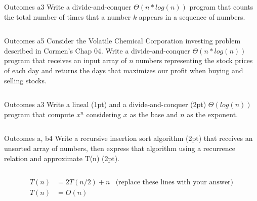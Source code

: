\begin{problem}{Outcomes a}{3}
    Write a divide-and-conquer $\Theta(n*log(n))$ program that counts the total number of times that a number $k$ appears in a sequence of numbers.

    \inputminted[fontsize=\small,breaklines]{cpp}{answers/problem2/problem2.cpp}
\end{problem}

\begin{problem}{Outcomes a}{5}
    Consider the Volatile Chemical Corporation investing problem described in Cormen's Chap 04.
    Write a divide-and-conquer $\Theta(n*log(n))$ program that receives an input array of $n$ numbers representing the stock prices of each day and returns the days that maximizes our profit when buying and selling stocks.

    \inputminted[fontsize=\small,breaklines]{cpp}{answers/problem3/problem3.cpp}
\end{problem}

\begin{problem}{Outcomes a}{3}
    Write a lineal (1pt) and a divide-and-conquer (2pt) $\Theta(log(n))$ program that compute $x^{n}$ considering $x$ as the base and $n$ as the exponent.

    \inputminted[fontsize=\small,breaklines]{cpp}{answers/problem4/problem4.cpp}
\end{problem}

\begin{problem}{Outcomes a, b}{4}
    Write a recursive insertion sort algorithm (2pt) that receives an unsorted array of numbers, then express that algorithm using a recurrence relation and approximate T(n) (2pt). 

    \inputminted[fontsize=\small,breaklines]{cpp}{answers/problem5/problem5.cpp}

    \begin{align*}
        T(n) &= 2T(n/2) + n & \text{(replace these lines with your answer)}\\ 
        T(n) &= O(n)
    \end{align*}
\end{problem}


